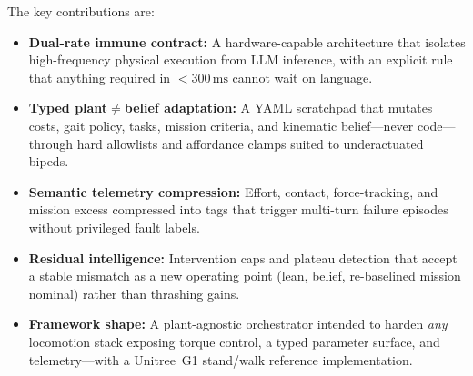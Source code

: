 The key contributions are:
\begin{itemize}
\item \textbf{Dual-rate immune contract:} A hardware-capable architecture that isolates high-frequency physical execution from LLM inference, with an explicit rule that anything required in ${<}300\,\mathrm{ms}$ cannot wait on language.
\item \textbf{Typed plant$\neq$belief adaptation:} A YAML scratchpad that mutates costs, gait policy, tasks, mission criteria, and kinematic belief---never code---through hard allowlists and affordance clamps suited to underactuated bipeds.
\item \textbf{Semantic telemetry compression:} Effort, contact, force-tracking, and mission excess compressed into tags that trigger multi-turn failure episodes without privileged fault labels.
\item \textbf{Residual intelligence:} Intervention caps and plateau detection that accept a stable mismatch as a new operating point (lean, belief, re-baselined mission nominal) rather than thrashing gains.
\item \textbf{Framework shape:} A plant-agnostic orchestrator intended to harden \emph{any} locomotion stack exposing torque control, a typed parameter surface, and telemetry---with a Unitree~G1 stand/walk reference implementation.
\end{itemize}
